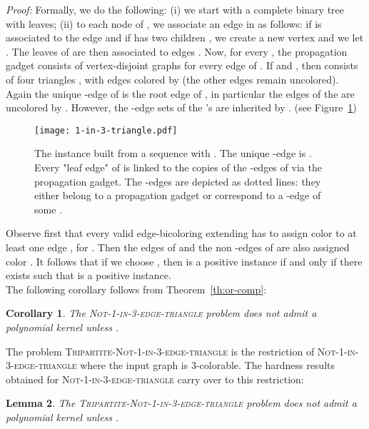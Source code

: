 \documentclass[11pt]{article}
\newenvironment{proof}{\noindent\textit{Proof: }}{{\hfill }}
\newtheorem{lemma}{Lemma}[section]
\newtheorem{corollary}[lemma]{Corollary}
\newcommand{\gbc}{\textsc{Not-1-in-3-edge-triangle}}
\newcommand{\tgbc}{\textsc{Tripartite-Not-1-in-3-edge-triangle}}
\begin{document}
\begin{proof}
Formally, we do the following: (i) we start with a complete binary tree  with  leaves; (ii) to each node  of , we associate an edge  in  as follows: if  is associated to the edge  and if  has two children , we create a new vertex  and we let . The leaves of  are then associated to edges . Now, for every , the propagation gadget  consists of vertex-disjoint graphs  for every edge  of . If  and , then  consists of four triangles , with edges  colored  by  (the other edges remain uncolored). Again the unique -edge of  is the root edge of , in particular the edges of the  are uncolored by . However, the -edge sets of the 's are inherited by . (see Figure~\ref{fig:not-1-in-3-triangle})


\begin{figure}[ht]
\centerline{\texttt{[image: 1-in-3-triangle.pdf]}}
\caption{The instance  built from a sequence  with . The unique -edge is . Every "leaf edge"  of  is linked to the copies of the -edges of  via the propagation gadget. The -edges are depicted as dotted lines: they either belong to a propagation gadget or correspond to a -edge of some .
\label{fig:not-1-in-3-triangle}}
\end{figure}


Observe first that every valid edge-bicoloring extending  has to assign color  to at least one edge , for . Then the edges of  and the  non -edges of  are also assigned color . It follows that if we choose , then  is a positive instance if and only if there exists  such that  is a positive instance.
 \end{proof}\\

The following corollary follows from Theorem~\ref{th:or-comp}:

\begin{corollary}
The \gbc{} problem does not admit a polynomial kernel unless .
\end{corollary}

The problem \tgbc{} is the restriction of \gbc{} where the input graph  is 3-colorable. The hardness results obtained for \gbc{} carry over to this restriction:

\begin{lemma} \label{prop2} 
The \tgbc{} problem  does not admit a polynomial kernel unless .
\end{lemma}
\end{document}
